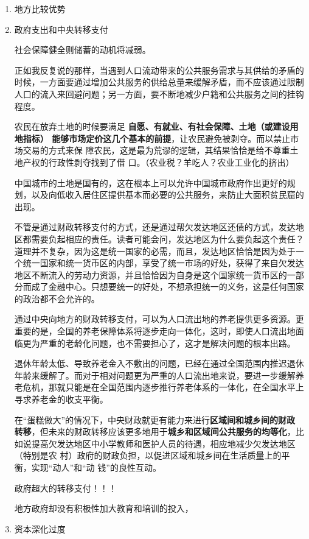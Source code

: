 \begin{enumerate}
\item 地方比较优势

\item 政府支出和中央转移支付

社会保障健全则储蓄的动机将减弱。

正如我反复说的那样，当遇到人口流动带来的公共服务需求与其供给的矛盾的时候，一方面要通过增加公共服务的供给总量来缓解矛盾，而不应该通过限制人口的流入来回避问题；另一方面，要不断地减少户籍和公共服务之间的挂钩程度。

农民在放弃土地的时候要满足\textbf{ 自愿、有就业、有社会保障、土地（或建设用地指标）
  能够市场定价这几个基本的前提}，让农民避免被剥夺。而以禁止市场交易的方式来保
障农民，这是最为荒谬的逻辑，其结果恰恰是给不尊重土地产权的行政性剥夺找到了借
口。（农业税？羊吃人？农业工业化的挤出）

中国城市的土地是国有的，这在根本上可以允许中国城市政府作出更好的规划，以及向低收入居住区提供基本而必要的公共服务，来防止大面积贫民窟的出现。

不管是通过财政转移支付的方式，还是通过帮欠发达地区还债的方式，发达地区都需要负起相应的责任。读者可能会问，发达地区为什么要负起这个责任？道理并不复杂，因为这是统一国家的必需，而且，发达地区恰恰是因为处于一个统一国家和统一货币区的内部，享受了统一市场的好处，获得了来自欠发达地区不断流入的劳动力资源，并且恰恰因为自身是这个国家统一货币区的一部分而成了金融中心。只想要统一的好处，不想承担统一的义务，这是任何国家的政治都不会允许的。

通过中央向地方的财政转移支付，可以为人口流出地的养老提供更多资源。更重要的是，全国的养老保障体系将逐步走向一体化，这时，即使人口流出地面临更为严重的老龄化问题，也不需要担心了，这才是解决问题的根本出路。

退休年龄太低、导致养老金入不敷出的问题，已经在通过全国范围内推迟退休年龄来缓解了。而对于相对问题更为严重的人口流出地来说，要进一步缓解养老危机，那就只能是在全国范围内逐步推行养老体系的一体化，在全国水平上寻求养老金的收支平衡。


在“蛋糕做大”的情况下，中央财政就更有能力来进行\textbf{区域间和城乡间的财政
  转移}，但未来的财政转移应该更多地用于\textbf{城乡和区域间公共服务的均等化}，比
如说提高欠发达地区中小学教师和医护人员的待遇，相应地减少欠发达地区（特别是农
村）政府的财政负担，以促进区域和城乡间在生活质量上的平衡，实现“动人”和“动
钱”的良性互动。

政府超大的转移支付！！！

地方政府却没有积极性加大教育和培训的投入，

\item 资本深化过度


\end{enumerate}
